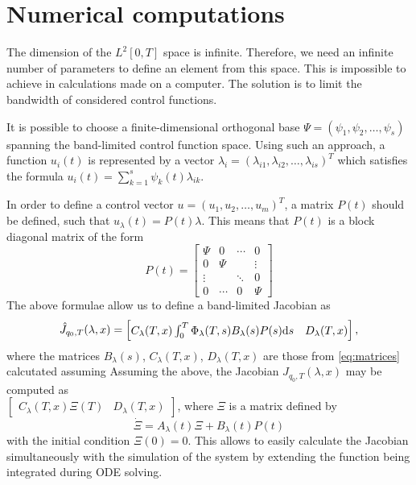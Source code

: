 \section{Numerical computations}
The dimension of the $L^2[0,T]$ space is infinite. Therefore, we need an infinite number of parameters to define an element from this space. This is impossible to achieve in calculations made on a computer. The solution is to limit the bandwidth of considered control functions. 

It is possible to choose a finite-dimensional orthogonal base $\Psi = ( \psi_1, \psi_2, \dots, \psi_s )$
spanning the band-limited control function space. 
Using such an approach, a function $u_i(t)$ is represented by a vector 
$\lambda_i = (\lambda_{i1}, \lambda_{i2}, \dots, \lambda_{is})^T$ 
which satisfies the formula $u_i(t) = \sum_{k=1}^s \psi_k(t) \lambda_{ik}$.

In order to define a control vector $u=(u_1, u_2, \dots, u_m)^T$, a matrix $P(t)$ should be defined, such that $u_\lambda(t)=P(t)\lambda$. This means that $P(t)$ is a block diagonal matrix of the form
\begin{equation}
\label{eq:Pt}
P(t)=\begin{bmatrix}
\Psi & 0 & \cdots & 0\\
0 & \Psi &  & \vdots\\
\vdots &  & \ddots & 0 \\
0 &  \cdots & 0 & \Psi
\end{bmatrix}
\end{equation}
The above formulae allow us to define a band-limited Jacobian as \cite{ecs_ijc}
\begin{equation}
\hat J_{q_0, T}(\lambda, x)=\begin{bmatrix}C_\lambda(T,x)\int_0^T \Phi_\lambda(T,s)B_\lambda(s) P(s)\mathrm{d} s
& D_\lambda(T,x)\end{bmatrix},
\end{equation}
where the matrices $B_\lambda(s)$, $C_\lambda(T,x)$, $D_\lambda(T,x)$ are those from \eqref{eq:matrices}
calcutated assuming 
Assuming the above, the Jacobian $\hat J_{q_0, T}(\lambda, x)$
may be computed as\\ $\begin{bmatrix}
C_\lambda(T,x)\Xi(T)& D_\lambda(T,x)
\end{bmatrix}$, where $\Xi$ is a matrix defined by  
\begin{equation}
\dot \Xi = A_\lambda(t)\Xi +B_\lambda(t)P(t)
\end{equation}
with the initial condition $\Xi(0)=0$. 
This allows to easily calculate the Jacobian simultaneously with the simulation
of the system by extending the function being integrated during ODE solving.

